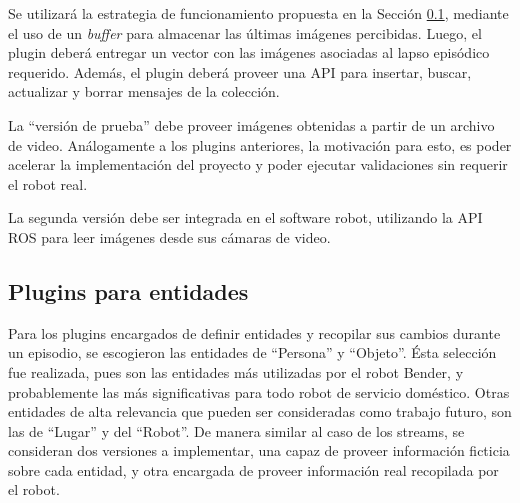
Se utilizará la estrategia de funcionamiento propuesta en la Sección \ref{}, mediante el uso de un \textit{buffer} para almacenar las últimas imágenes percibidas. Luego, el plugin deberá entregar un vector con las imágenes asociadas al lapso episódico requerido. Además, el plugin deberá proveer una API para insertar, buscar, actualizar y borrar mensajes de la colección.

La ``versión de prueba'' debe proveer imágenes obtenidas a partir de un archivo de video. Análogamente a los plugins anteriores, la motivación para esto, es poder acelerar la implementación del proyecto y poder ejecutar validaciones sin requerir el robot real.

La segunda versión debe ser integrada en el software robot, utilizando la API ROS para leer imágenes desde sus cámaras de video.

\subsection{Plugins para entidades}

Para los plugins encargados de definir entidades y recopilar sus cambios durante un episodio, se escogieron las entidades de ``Persona'' y ``Objeto''. Ésta selección fue realizada, pues son las entidades más utilizadas por el robot Bender, y probablemente las más significativas para todo robot de servicio doméstico. Otras entidades de alta relevancia que pueden ser consideradas como trabajo futuro, son las de ``Lugar'' y del ``Robot''. De manera similar al caso de los streams, se consideran dos versiones a implementar, una capaz de proveer información ficticia sobre cada entidad, y otra encargada de proveer información real recopilada por el robot.

